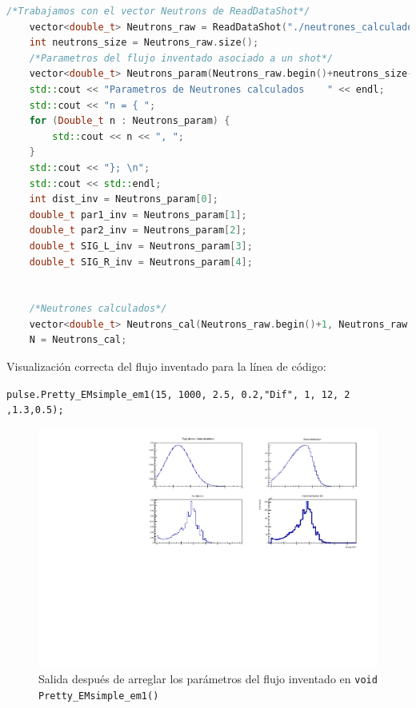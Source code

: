 \documentclass[11pt,letterpaper]{article}
\begin{document}
\begin{lstlisting}[language=c++]
/*Trabajamos con el vector Neutrons de ReadDataShot*/
	vector<double_t> Neutrons_raw = ReadDataShot("./neutrones_calculados/neutrones_calculados_merge.dat", shot, ndet); /*vector de 12 entradas con toda la info */
	int neutrons_size = Neutrons_raw.size();
	/*Parametros del flujo inventado asociado a un shot*/
	vector<double_t> Neutrons_param(Neutrons_raw.begin()+neutrons_size-5, Neutrons_raw.begin()+neutrons_size);
	std::cout << "Parametros de Neutrones calculados	" << endl;
	std::cout << "n = { ";
    for (Double_t n : Neutrons_param) {
        std::cout << n << ", ";
    }
    std::cout << "}; \n";
	std::cout << std::endl;
	int dist_inv = Neutrons_param[0];
	double_t par1_inv = Neutrons_param[1];
	double_t par2_inv = Neutrons_param[2];
	double_t SIG_L_inv = Neutrons_param[3];
	double_t SIG_R_inv = Neutrons_param[4];
	
	
	/*Neutrones calculados*/
	vector<double_t> Neutrons_cal(Neutrons_raw.begin()+1, Neutrons_raw.begin()+ndet+1);
	N = Neutrons_cal;
\end{lstlisting}

Visualización correcta del flujo inventado para la línea de código:

\verb|pulse.Pretty_EMsimple_em1(15, 1000, 2.5, 0.2,"Dif", 1, 12, 2 ,1.3,0.5);|

\begin{figure}[H]
    \includegraphics[width=1\textwidth]{img/flux_inventado_arreglado_en_em1.pdf}
    \centering
     \cprotect\caption{Salida después de arreglar los parámetros del flujo inventado en \verb|void Pretty_EMsimple_em1()| }
\end{figure}
\end{document}
